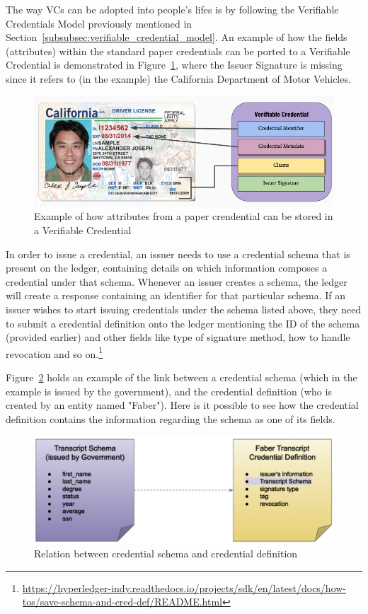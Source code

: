 The way VCs can be adopted into people's lifes is by following the Verifiable Credentials Model previously mentioned in Section~\ref{subsubsec:verifiable_credential_model}. An example of how the fields (attributes) within the standard paper credentials can be ported to a Verifiable Credential is demonstrated in Figure~\ref{fig:example_VC}, where the Issuer Signature is missing since it refers to (in the example) the California Department of Motor Vehicles.
\begin{figure}[!htb]
    \centering
    \includegraphics[width=0.7\linewidth]{images/Verifiable_Credentials.png}
    \caption[Example of how attributes from a paper crendential can be stored in a Verifiable Credential]{Example of how attributes from a paper crendential can be stored in a Verifiable Credential \protect\footnotemark}
    \label{fig:example_VC}
\end{figure}
In order to issue a credential, an issuer needs to use a credential schema that is present on the ledger, containing details on which information composes a credential under that schema.
Whenever an issuer creates a schema, the ledger will create a response containing an identifier for that particular schema. If an issuer wishes to start issuing credentials under the schema listed above, they need to submit a credential definition onto the ledger mentioning the ID of the schema (provided earlier) and other fields like type of signature method, how to handle revocation and so on.\footnote{\url{https://hyperledger-indy.readthedocs.io/projects/sdk/en/latest/docs/how-tos/save-schema-and-cred-def/README.html}}

Figure~\ref{fig:relation_between_credential_schema_and_definition} holds an example of the link between a credential schema (which in the example is issued by the government), and the credential definition (who is created by an entity named "Faber"). Here is it possible to see how the credential definition contains the information regarding the schema as one of its fields. 

\begin{figure}[!htb]
    \centering
    \includegraphics[width=0.7\linewidth]{images/schema-credential.png}
    \caption[Relation between credential schema and credential definition]{Relation between credential schema and credential definition \protect\footnotemark}
    \label{fig:relation_between_credential_schema_and_definition}
\end{figure}


